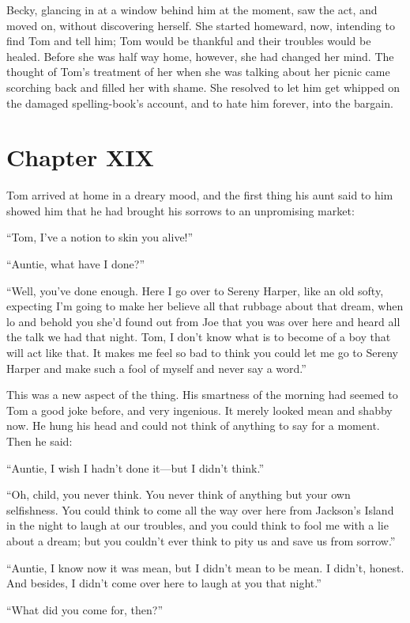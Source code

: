 \documentclass{book}
\begin{document}
Becky, glancing in at a window behind him at the moment, saw the act, and moved on, without discovering herself. She started homeward, now, intending to find Tom and tell him; Tom would be thankful and their troubles would be healed. Before she was half way home, however, she had changed her mind. The thought of Tom’s treatment of her when she was talking about her picnic came scorching back and filled her with shame. She resolved to let him get whipped on the damaged spelling-book’s account, and to hate him forever, into the bargain.

\chapter*{Chapter XIX}

Tom arrived at home in a dreary mood, and the first thing his aunt said to him showed him that he had brought his sorrows to an unpromising market:

“Tom, I’ve a notion to skin you alive!”

“Auntie, what have I done?”

“Well, you’ve done enough. Here I go over to Sereny Harper, like an old softy, expecting I’m going to make her believe all that rubbage about that dream, when lo and behold you she’d found out from Joe that you was over here and heard all the talk we had that night. Tom, I don’t know what is to become of a boy that will act like that. It makes me feel so bad to think you could let me go to Sereny Harper and make such a fool of myself and never say a word.”

This was a new aspect of the thing. His smartness of the morning had seemed to Tom a good joke before, and very ingenious. It merely looked mean and shabby now. He hung his head and could not think of anything to say for a moment. Then he said:

“Auntie, I wish I hadn’t done it—but I didn’t think.”

“Oh, child, you never think. You never think of anything but your own selfishness. You could think to come all the way over here from Jackson’s Island in the night to laugh at our troubles, and you could think to fool me with a lie about a dream; but you couldn’t ever think to pity us and save us from sorrow.”

“Auntie, I know now it was mean, but I didn’t mean to be mean. I didn’t, honest. And besides, I didn’t come over here to laugh at you that night.”

“What did you come for, then?”
\end{document}
